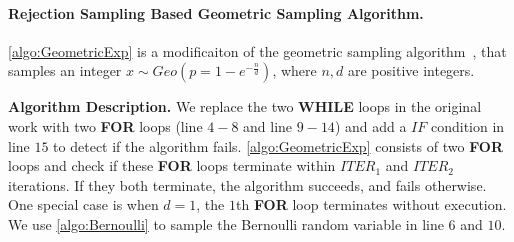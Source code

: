 



\paragraph{Rejection Sampling Based Geometric Sampling Algorithm.}
\label{para:RejectionSamplingBasedGeometricSamplingAlgorithm}

\autoref{algo:GeometricExp} is a modificaiton of the geometric sampling algorithm~\cite{canonne2020discrete}, that samples an integer $x\sim Geo\left( p=1-e^{-\frac{n}{d}}\right)$, where $n,d$ are positive integers.

\textbf{Algorithm Description.}
We replace the two \textbf{WHILE} loops in the original work with two \textbf{FOR} loops (line $4-8$ and line $9-14$) and add a $IF$ condition in line $15$ to detect if the algorithm fails.
\autoref{algo:GeometricExp} consists of two \textbf{FOR} loops and check if these \textbf{FOR} loops terminate within $ITER_1$ and $ITER_2$ iterations. If they both terminate, the algorithm succeeds, and fails otherwise.
One special case is when $d=1$, the $1$th \textbf{FOR} loop terminates without execution.
We use \autoref{algo:Bernoulli} to sample the Bernoulli random variable in line $6$ and $10$.

